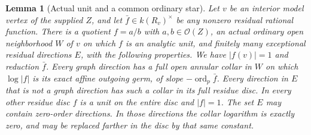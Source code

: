 \documentclass[11pt]{article}
\newtheorem{lemma}[theorem]{Lemma}
\newcommand{\ord}{\operatorname{ord}}
\begin{document}
\begin{lemma}[Actual unit and a common ordinary star]\label{lem:star}
Let $v$ be an interior model vertex of the supplied $Z$, and let
$\bar f\in k(R_v)^\times$ be any nonzero residual rational function.
There is a quotient $f=a/b$ with $a,b\in\mathcal O(Z)$, an actual
ordinary open neighborhood $W$ of $v$ on which $f$ is an analytic
unit, and finitely many exceptional residual directions $E$, with
the following properties. We have $|f(v)|=1$ and reduction $\bar f$.
Every graph direction has a full open annular collar in $W$ on
which $\log|f|$ is its exact affine outgoing germ, of slope
$-\ord_p\bar f$. Every direction in $E$ that is not a graph
direction has such a collar in its full residue disc. In every
other residue disc $f$ is a unit on the entire disc and $|f|=1$.
The set $E$ may contain zero-order directions. In those directions
the collar logarithm is exactly zero, and may be replaced farther
in the disc by that same constant.
\end{lemma}
\end{document}
